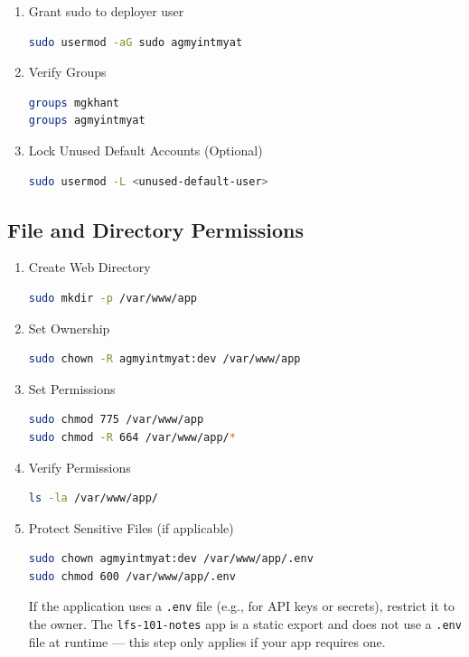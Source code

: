 \documentclass[12pt,a4paper]{report}
\begin{document}
\begin{enumerate}
\item Grant sudo to deployer user
\begin{lstlisting}[language=bash]
sudo usermod -aG sudo agmyintmyat
\end{lstlisting}

\item Verify Groups
\begin{lstlisting}[language=bash]
groups mgkhant
groups agmyintmyat
\end{lstlisting}

\item Lock Unused Default Accounts (Optional)
\begin{lstlisting}[language=bash]
sudo usermod -L <unused-default-user>
\end{lstlisting}
\end{enumerate}

\subsection{File and Directory Permissions}
\begin{enumerate}
\item Create Web Directory
\begin{lstlisting}[language=bash]
sudo mkdir -p /var/www/app
\end{lstlisting}

\item Set Ownership
\begin{lstlisting}[language=bash]
sudo chown -R agmyintmyat:dev /var/www/app
\end{lstlisting}

\item Set Permissions
\begin{lstlisting}[language=bash]
sudo chmod 775 /var/www/app
sudo chmod -R 664 /var/www/app/*
\end{lstlisting}

\item Verify Permissions
\begin{lstlisting}[language=bash]
ls -la /var/www/app/
\end{lstlisting}

\item Protect Sensitive Files (if applicable)
\begin{lstlisting}[language=bash]
sudo chown agmyintmyat:dev /var/www/app/.env
sudo chmod 600 /var/www/app/.env
\end{lstlisting}
\begin{markdownnote}
If the application uses a \texttt{.env} file (e.g., for API keys or secrets), restrict it to the owner. The \texttt{lfs-101-notes} app is a static export and does not use a \texttt{.env} file at runtime --- this step only applies if your app requires one.
\end{markdownnote}
\end{enumerate}
\end{document}
